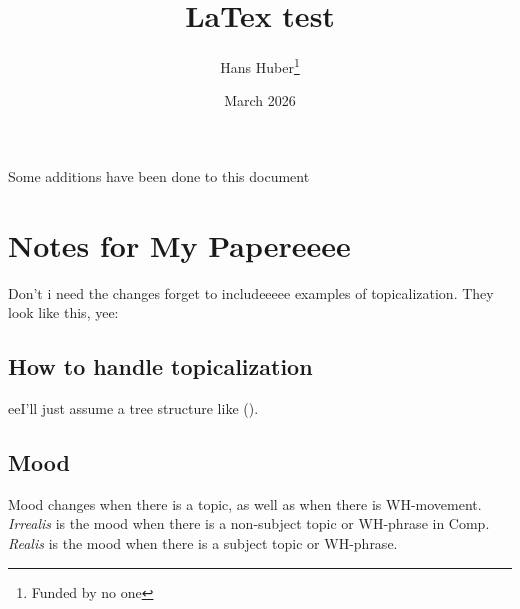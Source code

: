 \documentclass[12pt]{article}
\title{LaTex test}
\author{Hans Huber\thanks{Funded by no one}}
\date{March 2026}
\begin{document}
\maketitle
Some additions have been done to this \LaTex{} document

\section*{Notes for My Papereeee}

Don't i need the changes forget to includeeeee examples of topicalization.
They look like this, yee:

{\small
{}
}

\subsection*{How to handle topicalization}

eeI'll just assume a tree structure like ().

{\small
{}
}

\subsection*{Mood}

Mood changes when there is a topic, as well as when
there is WH-movement.  \emph{Irrealis} is the mood when
there is a non-subject topic or WH-phrase in Comp.
\emph{Realis} is the mood when there is a subject topic
or WH-phrase.
\end{document}
